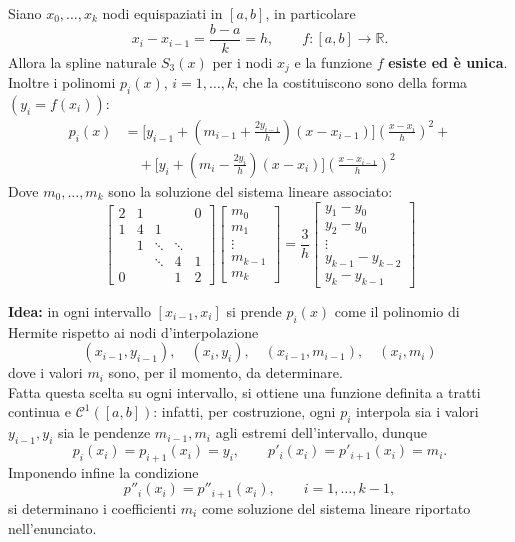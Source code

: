 \documentclass[12pt,a4paper,]{report}
\begin{document}
\begin{teorema}
    Siano $x_0,\ldots,x_k$ nodi equispaziati in $[a,b]$, in particolare
    \[
    x_i-x_{i-1}=\frac{b-a}{k}=h,
    \qquad
    f:[a,b]\to\mathbb{R}.
    \]
    Allora la spline naturale $S_3(x)$ per i nodi $x_j$ e la funzione $f$ \textbf{esiste ed \`e unica}.
    Inoltre i polinomi $p_i(x)$, $i=1,\ldots,k$, che la costituiscono sono della forma $(y_i=f(x_i))$:
    \[
    \begin{aligned}
    p_i(x)
    &=
    \Bigg[
    y_{i-1}
    +\left(m_{i-1}+\frac{2y_{i-1}}{h}\right)(x-x_{i-1})
    \Bigg]
    \left(\frac{x-x_i}{h}\right)^2 +\\
    &\quad +
    \Bigg[
    y_i
    +\left(m_i-\frac{2y_i}{h}\right)(x-x_i)
    \Bigg]
    \left(\frac{x-x_{i-1}}{h}\right)^2
    \end{aligned}
    \]
    Dove $m_0,\ldots,m_k$ sono la soluzione del sistema lineare associato:
    \[
    \begin{bmatrix}
    2 & 1 &   &        & 0 \\[-10pt]
    1 & 4 & 1 &        &   \\[-10pt]
      & 1 & \ddots & \ddots &   \\[-10pt]
      &   & \ddots & 4 & 1 \\[-10pt]
    0 &   &        & 1 & 2
    \end{bmatrix}
    \begin{bmatrix}
    m_0 \\[-10pt] m_1 \\[-10pt] \vdots \\[-10pt] m_{k-1} \\[-10pt] m_k
    \end{bmatrix}
    =
    \frac{3}{h}
    \begin{bmatrix}
    y_1-y_0 \\[-10pt]
    y_2-y_0 \\[-10pt]
    \vdots \\[-10pt]
    y_{k-1}-y_{k-2} \\[-10pt]
    y_k-y_{k-1}
    \end{bmatrix}
    \]
\end{teorema}
\begin{dimostrazione}
    \textbf{Idea:} in ogni intervallo $[x_{i-1}, x_i]$ si prende $p_i(x)$ come il polinomio di Hermite rispetto ai nodi d'interpolazione
    \[
        (x_{i-1}, y_{i-1}), \quad (x_i, y_i), \quad (x_{i-1}, m_{i-1}), \quad (x_i, m_i)
    \]
    dove i valori $m_i$ sono, per il momento, da determinare.
    \\
    Fatta questa scelta su ogni intervallo, si ottiene una funzione definita a tratti continua e $\mathcal{C}^1([a,b])$: infatti, per costruzione, ogni $p_i$ interpola sia i valori $y_{i-1}, y_i$ sia le pendenze $m_{i-1}, m_i$ agli estremi dell'intervallo, dunque
    \[
        p_i(x_i) = p_{i+1}(x_i) = y_i,
        \qquad
        p'_i(x_i) = p'_{i+1}(x_i) = m_i.
    \]
    Imponendo infine la condizione
    \[
        p''_i(x_i) = p''_{i+1}(x_i), \qquad i = 1, \dots, k-1,
    \]
    si determinano i coefficienti $m_i$ come soluzione del sistema lineare riportato nell'enunciato.
\end{dimostrazione}
\end{document}
